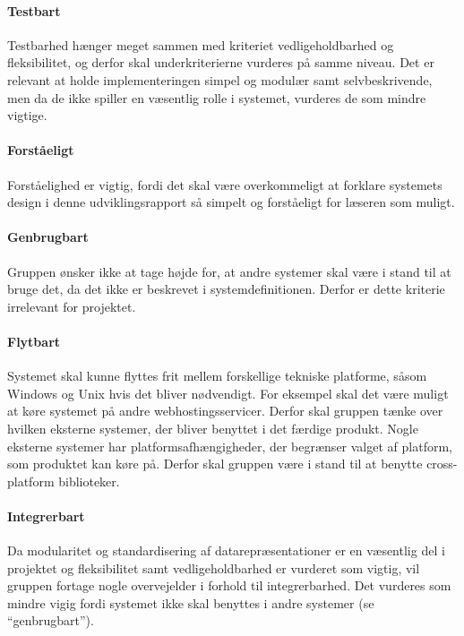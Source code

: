 \paragraph{Testbart} Testbarhed hænger meget sammen med kriteriet vedligeholdbarhed og fleksibilitet, og derfor skal underkriterierne vurderes på samme niveau. Det er relevant at holde implementeringen simpel og modulær samt selvbeskrivende, men da de ikke spiller en væsentlig rolle i systemet,  vurderes de som mindre vigtige.

\paragraph{Forståeligt} Forståelighed er vigtig, fordi det skal være overkommeligt at forklare systemets design i denne udviklingsrapport så simpelt og forståeligt for læseren som muligt.
 
\paragraph{Genbrugbart} Gruppen ønsker ikke at tage højde for, at andre systemer skal være i stand til at bruge det, da det ikke er beskrevet i systemdefinitionen. Derfor er dette kriterie irrelevant for projektet.

\paragraph{Flytbart} Systemet skal kunne flyttes frit mellem forskellige tekniske platforme, såsom Windows og Unix hvis det bliver nødvendigt. For eksempel skal det være muligt at køre systemet på andre webhostingsservicer. Derfor skal gruppen tænke over hvilken eksterne systemer, der bliver benyttet i det færdige produkt. Nogle eksterne systemer har platformsafhængigheder, der begrænser valget af platform, som produktet kan køre på. Derfor skal gruppen være i stand til at benytte cross-platform biblioteker.

\paragraph{Integrerbart} Da modularitet og standardisering af datarepræsentationer er en væsentlig del i projektet og fleksibilitet samt vedligeholdbarhed er vurderet som vigtig, vil gruppen fortage nogle overvejelder i forhold til integrerbarhed. Det vurderes som mindre vigig fordi systemet ikke skal benyttes i andre systemer (se ``genbrugbart'').
